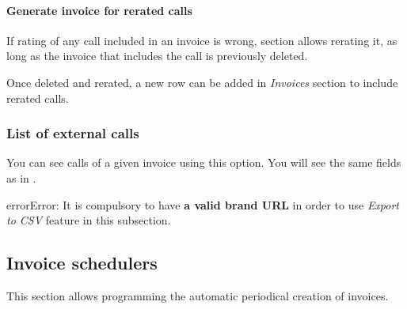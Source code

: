\documentclass[letterpaper,10pt,english]{sphinxmanual}
\begin{document}
\paragraph{Generate invoice for rerated calls}
\label{administration_portal/brand/invoicing/invoices:generate-invoice-for-rerated-calls}
If rating of any call included in an invoice is wrong, {\hyperref[administration_portal/platform/external_calls:external\string-calls]{}} section allows rerating it, as long as the
invoice that includes the call is previously deleted.

Once deleted and rerated, a new row can be added in \emph{Invoices} section to include rerated calls.


\subsubsection{List of external calls}
\label{administration_portal/brand/invoicing/invoices:list-of-external-calls}
You can see calls of a given invoice using this option. You will see the same fields as in {\hyperref[administration_portal/platform/external_calls:external\string-calls]{}}.

\begin{notice}{error}{Error:}
It is compulsory to have \textbf{a valid brand URL} in order to use \emph{Export to CSV} feature in this subsection.
\end{notice}


\subsection{Invoice schedulers}
\label{administration_portal/brand/invoicing/invoice_schedulers::doc}\label{administration_portal/brand/invoicing/invoice_schedulers:invoice-schedulers}
This section allows programming the automatic periodical creation of invoices.
\end{document}
